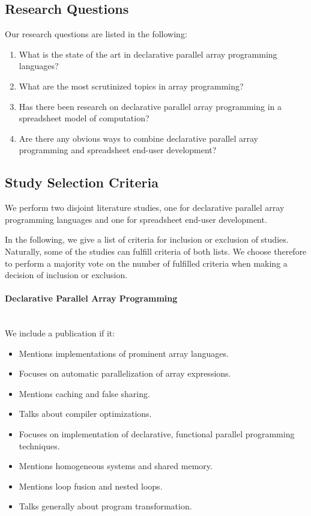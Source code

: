 \documentclass[a4paper]{article}
\begin{document}
\subsection{Research Questions}
\label{sec:research-questions}

Our research questions are listed in the following:

\begin{enumerate}
\item What is the state of the art in declarative parallel array
  programming languages?
\item What are the most scrutinized topics in array programming?
\item Has there been research on declarative parallel array
  programming in a spreadsheet model of computation?
\item Are there any obvious ways to combine declarative parallel array
  programming and spreadsheet end-user development?
\end{enumerate}

\subsection{Study Selection Criteria}
\label{sec:study-select-crit}

We perform two disjoint literature studies, one for declarative
parallel array programming languages and one for spreadsheet end-user
development.

In the following, we give a list of criteria for inclusion or
exclusion of studies. Naturally, some of the studies can fulfill
criteria of both lists. We choose therefore to perform a majority vote
on the number of fulfilled criteria when making a decision of
inclusion or exclusion.

\paragraph{Declarative Parallel Array Programming}
~\\

We include a publication if it:

\begin{itemize}
\item Mentions implementations of prominent array languages.
\item Focuses on automatic parallelization of array expressions.
\item Mentions caching and false sharing.
\item Talks about compiler optimizations.
\item Focuses on implementation of declarative, functional parallel
  programming techniques.
\item Mentions homogeneous systems and shared memory.
\item Mentions loop fusion and nested loops.
\item Talks generally about program transformation.
\end{itemize}
\end{document}
